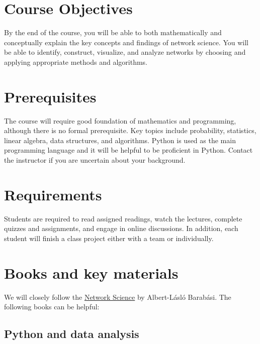 \documentclass[11pt,article,oneside]{memoir}
\begin{document}
\section{Course Objectives}

By the end of the course, you will be able to both mathematically and
conceptually explain the key concepts and findings of network science. You will
be able to identify, construct, visualize, and analyze networks by choosing and
applying appropriate methods and algorithms.   

\section{Prerequisites}
\label{sec:Prerequisites}

The course will require good foundation of mathematics and programming,
although there is no formal prerequisite.  Key topics include probability,
statistics, linear algebra, data structures, and algorithms. Python is used as
the main programming language and it will be helpful to be proficient in
Python. Contact the instructor if you are uncertain about your background. 

\section{Requirements}
\label{sec:requirements}

Students are required to read assigned readings, watch the lectures, complete
quizzes and assignments, and engage in online discussions. In addition, each
student will finish a class project either with a team or individually. 

\section{Books and key materials}

We will closely follow the
\href{http://barabasi.com/networksciencebook/}{Network Science} by Albert-Lásló
Barabási. The following books can be helpful:

\subsection{Python and data analysis}
\end{document}
